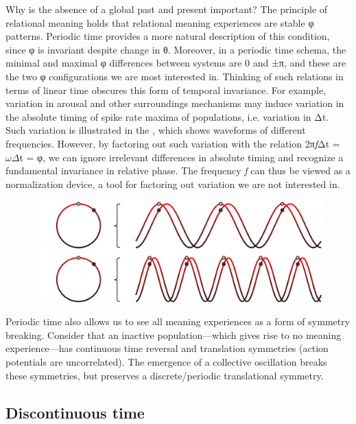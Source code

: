   Why is the absence of a global past and present important? The principle of relational meaning holds that relational meaning experiences are stable φ patterns. Periodic time provides a more natural description of this condition, since φ is invariant despite change in θ. Moreover, in a periodic time schema, the minimal and maximal φ differences between systems are 0 and ±π, and these are the two φ configurations we are most interested in. Thinking of such relations in terms of linear time obscures this form of temporal invariance. For example, variation in arousal and other surroundings mechanisms may induce variation in the absolute timing of spike rate maxima of populations, i.e. variation in Δt. Such variation is illustrated in the {\figurebelow}, which shows waveforms of different frequencies. However, by factoring out such variation with the relation 2π\textit{f}Δt = $\omega \Delta $t = φ, we can ignore irrelevant differences in absolute timing and recognize a fundamental invariance in relative phase. The frequency \textit{f} can thus be viewed as a normalization device, a tool for factoring out variation we are not interested in.

  
\begin{figure}
\includegraphics[width=\textwidth]{figures/Tilsen-img48.png}
\caption{\missingcaption}
\label{fig:3:20}
\end{figure}
 

  Periodic time also allows us to see all meaning experiences as a form of symmetry breaking. Consider that an inactive population—which gives rise to no meaning experience—has continuous time reversal and translation symmetries (action potentials are uncorrelated). The emergence of a collective oscillation breaks these symmetries, but preserves a discrete/periodic translational symmetry.

\subsection{Discontinuous time}

